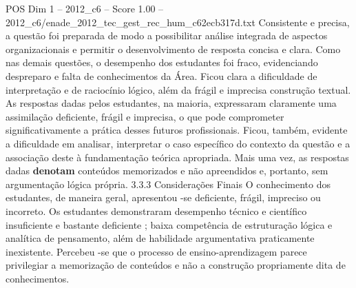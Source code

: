 \begin{textsample}{POS Dim 1 – 2012\_c6 – Score 1.00 – 2012\_c6/enade\_2012\_tec\_gest\_rec\_hum\_c62ecb317d.txt}
Consistente e precisa, a questão foi preparada de modo a possibilitar análise integrada de aspectos organizacionais e permitir o desenvolvimento de resposta concisa e clara.
Como nas demais questões, o desempenho dos estudantes foi fraco, evidenciando despreparo e falta de conhecimentos da Área.
Ficou clara a dificuldade de interpretação e de raciocínio lógico, além da frágil e imprecisa construção textual.
As respostas dadas pelos estudantes, na maioria, expressaram claramente uma assimilação deficiente, frágil e imprecisa, o que pode comprometer significativamente a prática desses futuros profissionais.
Ficou, também, evidente a dificuldade em analisar, interpretar o caso específico do contexto da questão e a associação deste à fundamentação teórica apropriada.
Mais uma vez, as respostas dadas \textbf{denotam} conteúdos memorizados e não apreendidos e, portanto, sem argumentação lógica própria. 3.3.3 Considerações Finais O conhecimento dos estudantes, de maneira geral, apresentou -se deficiente, frágil, impreciso ou incorreto.
Os estudantes demonstraram desempenho técnico e científico insuficiente e bastante deficiente ; baixa competência de estruturação lógica e analítica de pensamento, além de habilidade argumentativa praticamente inexistente.
Percebeu -se que o processo de ensino-aprendizagem parece privilegiar a memorização de conteúdos e não a construção propriamente dita de conhecimentos.

\end{textsample}
